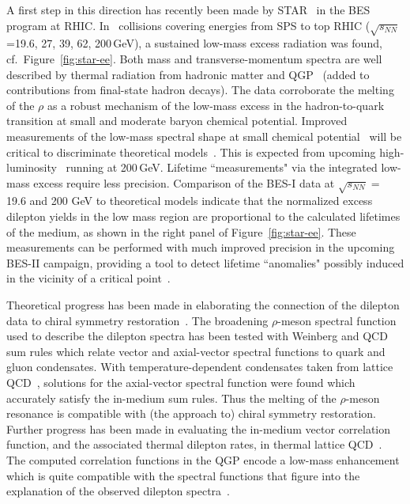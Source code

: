A first step in this direction has recently been made by
STAR~\cite{Adamczyk:2013caa,Huck:2014mfa,Adamczyk:2015bha} in the BES program at RHIC. In \AuAu\
collisions covering energies from SPS to top RHIC ($\sqrt{s_{NN}}$=19.6, 27, 39, 62, 200\,GeV),
a sustained low-mass excess radiation was found, cf.~Figure~\ref{fig:star-ee}.
Both mass and transverse-momentum spectra are well described by thermal radiation from
hadronic matter and QGP~\cite{Rapp:2013nxa} (added to contributions from final-state
hadron decays). The data corroborate the melting of the $\rho$  as a robust mechanism of the low-mass
excess in the hadron-to-quark transition at small and moderate baryon chemical potential.
Improved measurements of the low-mass spectral shape at small chemical
potential~\cite{Adamczyk:2013caa} will be critical to discriminate theoretical
models~\cite{Rapp:2000pe,Dusling:2007su,Linnyk:2011vx,Xu:2011tz,Vujanovic:2013jpa}.
This is expected from upcoming high-luminosity \AuAu\ running at 200\,GeV. Lifetime
``measurements" via the integrated low-mass excess require less precision. 
Comparison of 
the BES-I data at $\sqrt{s_{NN}} = $ 19.6 and 200 GeV to theoretical models indicate
that the normalized excess dilepton yields in the low mass region are proportional to the calculated lifetimes of the medium, 
as shown in the right panel of Figure~\ref{fig:star-ee}.
These measurements can be performed with much improved precision in the upcoming BES-II campaign, 
providing a tool to
detect lifetime ``anomalies" possibly induced in the vicinity of a critical
point~\cite{Rapp:2014hha}.

Theoretical progress has been made in elaborating the connection of the dilepton data
to chiral symmetry restoration~\cite{Hohler:2013eba}. The broadening $\rho$-meson
spectral function used to describe the dilepton spectra has been tested  with Weinberg
and QCD sum rules which relate vector and axial-vector spectral functions to quark and
gluon condensates. With temperature-dependent condensates taken from
lattice QCD~\cite{Borsanyi:2010bp}, solutions for the axial-vector spectral function
were found which accurately satisfy the in-medium sum rules. Thus the melting of the
$\rho$-meson resonance is compatible with (the approach to) chiral symmetry restoration.
Further progress has been made in evaluating the in-medium vector correlation function,
and the associated thermal dilepton rates, in thermal lattice
QCD~\cite{Ding:2010ga,Brandt:2012jc}. The computed correlation functions in the QGP
encode a low-mass enhancement which is quite compatible with the spectral functions
that figure into the explanation of the observed dilepton spectra~\cite{Rapp:2011is}.

